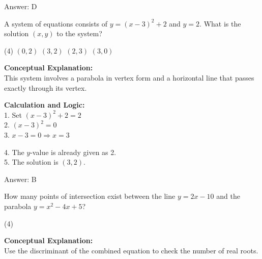 \documentclass[11pt,paper=a4,answers]{exam}
\begin{document}
\begin{questions}
\begin{solution}
\vspace{25pt}

Answer: \colorbox{yellow!100}{D}
\end{solution}

\vspace{40pt}

\question
A system of equations consists of $y = (x - 3)^2 + 2$ and $y = 2$. What is the solution $(x, y)$ to the system?
\begin{tasks}(4)
    \task $(0, 2)$
    \task $(3, 2)$
    \task $(2, 3)$
    \task $(3, 0)$
\end{tasks}

\begin{solution}
\textbf{Conceptual Explanation:} \\
This system involves a parabola in vertex form and a horizontal line that passes exactly through its vertex.

\vspace{20pt}

\textbf{Calculation and Logic:} \\
1. Set $(x - 3)^2 + 2 = 2$ \\
2. $(x - 3)^2 = 0$ \\
3. $x - 3 = 0 \Rightarrow x = 3$

\vspace{10pt}

4. The $y$-value is already given as 2. \\
5. The solution is $(3, 2)$.

\vspace{25pt}

Answer: \colorbox{yellow!100}{B}
\end{solution}

\vspace{40pt}

\question
How many points of intersection exist between the line $y = 2x - 10$ and the parabola $y = x^2 - 4x + 5$?
\begin{tasks}(4)
\end{tasks}

\begin{solution}
\textbf{Conceptual Explanation:} \\
Use the discriminant of the combined equation to check the number of real roots.


\end{solution}
\end{questions}
\end{document}
